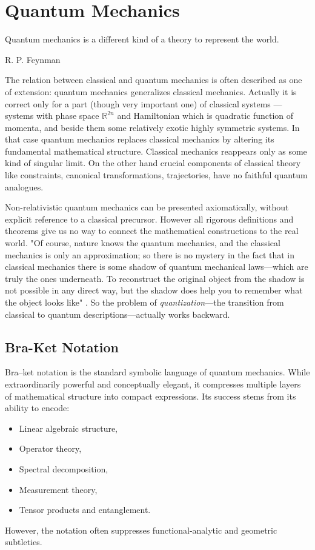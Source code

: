 
\chapter{Quantum Mechanics}
\label{quant-mech}
{
    \setlength{}
\epigraph{ Quantum mechanics is a
different kind of a theory to represent the world.
} {R. P. Feynman}
}
The relation between classical and quantum mechanics is often
described as one of extension: quantum mechanics generalizes
classical mechanics. Actually it is correct only for a
part (though very important one) of classical
 systems ---  systems with phase space $ \mathbb{R}^{2 n} $
 and  Hamiltonian which is quadratic function of momenta,
 and beside them some relatively exotic highly symmetric systems. 
 In that case quantum mechanics
replaces classical mechanics by altering its fundamental
mathematical structure. Classical mechanics reappears only 
as some kind of  singular limit.
On the other hand  crucial components of classical theory 
like constraints, canonical transformations, trajectories,
have no faithful quantum analogues.

Non-relativistic quantum mechanics can be presented axiomatically,
without explicit reference to a classical precursor. 
However all rigorous definitions and theorems give us no way to connect 
the mathematical constructions to the real world. 
"Of course, nature knows the quantum mechanics,
and the classical mechanics is only an approximation; so there is no mystery in
the fact that in classical mechanics there is some shadow of quantum mechanical
laws---which are truly the ones underneath. To reconstruct the original object
from the shadow is not possible in any direct way, but the shadow does help
you to remember what the object looks like" \cite{flp3}. 
So the problem of \emph{quantization}---the transition from 
classical to quantum descriptions---actually works backward.

\section{Bra-Ket Notation}
\label{bra-ket-notation}

Bra--ket notation is the standard symbolic language of quantum
mechanics. While extraordinarily powerful and conceptually elegant,
it compresses multiple layers of mathematical structure into compact
expressions. 
Its success stems from its ability to encode:
\begin{itemize}
\item Linear algebraic structure,
\item Operator theory,
\item Spectral decomposition,
\item Measurement theory,
\item Tensor products and entanglement.
\end{itemize}
However, the notation often suppresses functional-analytic and
geometric subtleties. 

